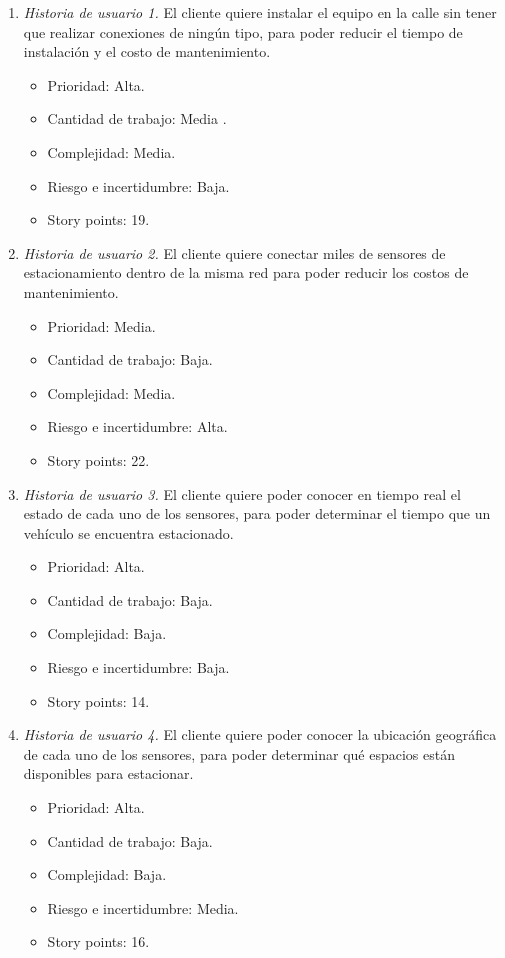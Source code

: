 \documentclass[
11pt, %
]{charter}
\begin{document}
\begin{enumerate}
\item \textit{Historia de usuario 1.} El cliente quiere instalar el equipo en la calle sin tener que realizar conexiones de ningún tipo, para poder reducir el tiempo de instalación y el costo de mantenimiento.
	\begin{itemize}
		\item Prioridad: Alta.
		\item Cantidad de trabajo: Media .
		\item Complejidad: Media.
		\item Riesgo e incertidumbre: Baja.
		\item Story points: 19.
	\end{itemize}
	
	\item \textit{Historia de usuario 2.} El cliente quiere conectar miles de sensores de estacionamiento dentro de la misma red para poder reducir los costos de mantenimiento.
	\begin{itemize}
		\item Prioridad: Media.
		\item Cantidad de trabajo: Baja.
		\item Complejidad: Media.
		\item Riesgo e incertidumbre: Alta.
		\item Story points: 22.
	\end{itemize}
	
		\item \textit{Historia de usuario 3.} El cliente quiere poder conocer en tiempo real el estado de cada uno de los sensores, para poder determinar el tiempo que un vehículo se encuentra estacionado.
	\begin{itemize}
		\item Prioridad: Alta.
		\item Cantidad de trabajo: Baja.
		\item Complejidad: Baja.
		\item Riesgo e incertidumbre: Baja.
		\item Story points: 14.
	\end{itemize}
	
	\item \textit{Historia de usuario 4.} El cliente quiere poder conocer la ubicación geográfica de cada uno de los sensores, para poder determinar qué espacios están disponibles para estacionar.
	\begin{itemize}
		\item Prioridad: Alta.
		\item Cantidad de trabajo: Baja.
		\item Complejidad: Baja.
		\item Riesgo e incertidumbre: Media.
		\item Story points: 16.
	\end{itemize}
	

\end{enumerate}
\end{document}
